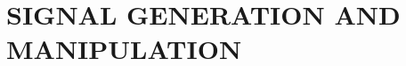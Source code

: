 \documentclass[a4paper,12pt]{report}
\newcommand{\labtopic}{\uppercase{Signal generation and manipulation}}
\begin{document}

\newpage
\section*{\centering \Huge{\labtopic}}

\newpage


\end{document}

